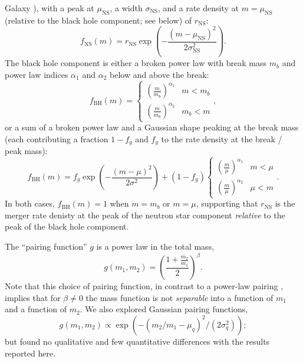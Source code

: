 \documentclass[modern]{aastex631}
\begin{document}
Galaxy \citep{Farr2020,Alsing2018}), with a peak at $\mu_\mathrm{NS}$, a width
$\sigma_\mathrm{NS}$, and a rate density at $m = \mu_\mathrm{NS}$ (relative to
the black hole component; see below) of $r_\mathrm{NS}$:
\begin{equation}
    f_\mathrm{NS}(m) = r_\mathrm{NS} \exp\left( - \frac{\left( m - \mu_\mathrm{NS} \right)^2}{2 \sigma_\mathrm{NS}^2} \right).
\end{equation}
The black hole component is either a broken power law with break mass $m_b$ and
power law indices $\alpha_1$ and $\alpha_2$ below and above the break:
\begin{equation}
    f_\mathrm{BH}(m) = \begin{cases}
        \left( \frac{m}{m_b} \right)^{\alpha_1} & m < m_b \\
        \left( \frac{m}{m_b} \right)^{\alpha_2} & m_b < m
    \end{cases}, 
\end{equation}
or a sum of a broken power law and a Gaussian shape peaking at the break mass
(each contributing a fraction $1-f_g$ and $f_g$ to the rate density at the break
/ peak mass):
\begin{equation}
    f_\mathrm{BH}(m) = f_g \exp\left( - \frac{\left( m - \mu \right)^2}{2 \sigma^2} \right) + \left( 1 - f_g \right) 
    \begin{cases}
        \left( \frac{m}{\mu} \right)^{\alpha_1} & m < \mu \\
        \left( \frac{m}{\mu} \right)^{\alpha_2} & \mu < m
    \end{cases}.
\end{equation}
In both cases, $f_\mathrm{BH}(m) = 1$ when $m = m_b$ or $m = \mu$, supporting
that $r_\mathrm{NS}$ is the merger rate denisty at the peak of the neutron star
component \emph{relative} to the peak of the black hole component.

The ``pairing function'' \citep{Fishbach2020} $g$ is a power law in the total
mass,
\begin{equation}
    g(m_1, m_2) = \left( \frac{1 + \frac{m_2}{m_1}}{2} \right)^{\beta}.
\end{equation}
Note that this choice of pairing function, in contrast to a power-law pairing
\citep{KAGRA:2021duu}, implies that for $\beta \neq 0$ the mass function is not
\emph{separable} into a function of $m_1$ and a function of $m_2$.  We also
explored Gaussian pairing functions,
\begin{equation}
    g\left(m_1, m_2 \right) \propto \exp\left( - \left( m_2/m_1 - \mu_q \right)^2 /
\left( 2 \sigma_q^2 \right) \right);
\end{equation} 
but found no qualitative and few quantitative differences with the results
reported here.
\end{document}
